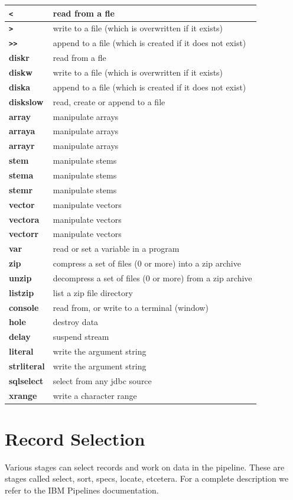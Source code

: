 \begin{tabularx}{\textwidth}{>{\bfseries}lX}
\toprule
\texttt{<}&read from a fle
\\\midrule
\texttt{>}&write to a file (which is overwritten if it exists)
\\\midrule
\texttt{>>}&append to a file (which is created if it does not exist)
\\\midrule
diskr&read from a fle
\\\midrule
diskw&write to a file (which is overwritten if it exists)
\\\midrule
diska&append to a file (which is created if it does not exist)
\\\midrule
diskslow&read, create or append to a file
\\\midrule
array&manipulate arrays
\\\midrule
arraya&manipulate arrays
\\\midrule
arrayr&manipulate arrays
\\\midrule
stem&manipulate stems
\\\midrule
stema&manipulate stems
\\\midrule
stemr&manipulate stems
\\\midrule
vector&manipulate vectors
\\\midrule
vectora&manipulate vectors
\\\midrule
vectorr&manipulate vectors
\\\midrule
var&read or set a variable in a \nr{} program
\\\midrule
zip&compress a set of files (0 or more) into a zip archive
\\\midrule
unzip&decompress a set of files (0 or more) from a zip archive
\\\midrule
listzip&list a zip file directory
\\\midrule
console& read from, or write to a terminal (window)
\\\midrule
hole&destroy data
\\\midrule
delay&suspend stream
\\\midrule
literal&write the argument string
\\\midrule
strliteral&write the argument string
\\\midrule
sqlselect&select from any jdbc source
\\\midrule
xrange&write a character range
\\\bottomrule
\end{tabularx}


\chapter{Record Selection}
Various stages can select records and work on data in the
pipeline. These are stages called select, sort, specs, locate,
etcetera. For a complete description we refer to the IBM Pipelines
documentation. 

